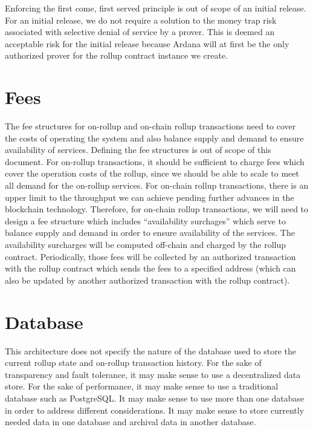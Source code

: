\documentclass[12pt]{article}
\begin{document}
Enforcing the first come, first served principle is out of scope of an initial release. For an initial release, we do not require a solution to the money trap risk associated with selective denial of service by a prover. This is deemed an acceptable risk for the initial release because Ardana will at first be the only authorized prover for the rollup contract instance we create.


\section{Fees}

The fee structures for on-rollup and on-chain rollup transactions need to cover the costs of operating the system and also balance supply and demand to ensure availability of services. Defining the fee structures is out of scope of this document. For on-rollup transactions, it should be sufficient to charge fees which cover the operation costs of the rollup, since we should be able to scale to meet all demand for the on-rollup services. For on-chain rollup transactions, there is an upper limit to the throughput we can achieve pending further advances in the blockchain technology. Therefore, for on-chain rollup transactions, we will need to design a fee structure which includes ``availability surchages'' which serve to balance supply and demand in order to ensure availability of the services. The availability surcharges will be computed off-chain and charged by the rollup contract. Periodically, those fees will be collected by an authorized transaction with the rollup contract which sends the fees to a specified address (which can also be updated by another authorized transaction with the rollup contract).


\section{Database}

This architecture does not specify the nature of the database used to store the current rollup state and on-rollup transaction history. For the sake of transparency and fault tolerance, it may make sense to use a decentralized data store. For the sake of performance, it may make sense to use a traditional database such as PostgreSQL. It may make sense to use more than one database in order to address different considerations. It may make sense to store currently needed data in one database and archival data in another database.
\end{document}
